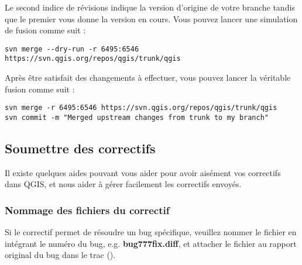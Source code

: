 Le second indice de révisions indique la version d'origine de votre branche tandis que le premier vous donne la version en cours. Vous pouvez lancer une simulation de fusion comme suit :

\begin{verbatim}
svn merge --dry-run -r 6495:6546 https://svn.qgis.org/repos/qgis/trunk/qgis
\end{verbatim}

Après être satisfait des changements à effectuer, vous pouvez lancer la véritable fusion comme suit : 
\begin{verbatim}
svn merge -r 6495:6546 https://svn.qgis.org/repos/qgis/trunk/qgis
svn commit -m "Merged upstream changes from trunk to my branch"
\end{verbatim}

\subsection{Soumettre des correctifs}
Il existe quelques aides pouvant vous aider pour avoir aisément vos correctifs dans QGIS, et nous aider à gérer facilement les correctifs envoyés.

\subsubsection{Nommage des fichiers du correctif}
Si le correctif permet de résoudre un bug spécifique, veuillez nommer le fichier en intégrant le numéro du bug, e.g. 
\textbf{bug777fix.diff}, et attacher le fichier au rapport original du bug dans le trac ().

